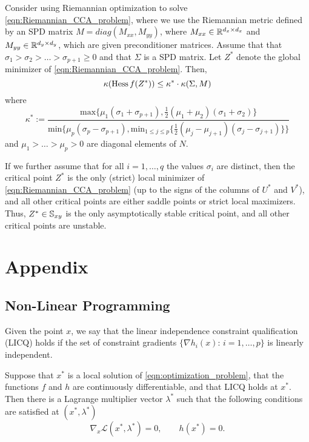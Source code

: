\documentclass[11pt,a4paper]{article}
\begin{document}
\begin{proposition}
Consider using Riemannian optimization to solve \eqref{eqn:Riemannian_CCA_problem}, where we use the Riemannian metric defined by an SPD matrix $M = diag(M_{xx},M_{yy})$, where $M_{xx}\in\mathbb{R}^{d_x\times d_x}$ and $M_{yy}\in\mathbb{R}^{d_y\times d_y}$, which are given preconditioner matrices. Assume that that $\sigma_1>\sigma_2>\ldots>\sigma_{p+1}\ge 0$ and that $\Sigma$ is a SPD matrix. Let $Z^*$ denote the global minimizer of \eqref{eqn:Riemannian_CCA_problem}. Then,
\begin{equation*}
\kappa(\text{Hess}\, f(Z^*)) \le \kappa^*\cdot \kappa(\Sigma, M)
\end{equation*}
where 
\begin{equation*}
\kappa^* := \dfrac{\text{max}\{\mu_1(\sigma_1+\sigma_{p+1}),\frac{1}{2}(\mu_1+\mu_2)(\sigma_1+\sigma_{2})\}}{\text{min}\{\mu_p(\sigma_p-\sigma_{p+1}),{\text{min}}_{1\le j\le p}\{\frac{1}{2}(\mu_j-\mu_{j+1})(\sigma_j-\sigma_{j+1})\}\}}
\end{equation*}
and $\mu_1>\ldots>\mu_p>0$ are diagonal elements of $N$.

If we further assume that for all $i = 1,\ldots, q$ the values $\sigma_i$ are distinct, then the critical point $Z^*$ is the only (strict) local minimizer of \eqref{eqn:Riemannian_CCA_problem} (up to the signs of the columns of $U^*$ and $V^*$), and all other critical points are either saddle points or strict local maximizers. Thus, $Z^*\in \mathbb{S}_{xy}$ is the only asymptotically stable critical point, and all other critical points are unstable.
\end{proposition}


\section{Appendix}

\subsection{Non-Linear Programming}

\begin{definition}
Given the point $x$, we say that the linear independence constraint qualification (LICQ) holds if the set of constraint gradients $\{\nabla h_i(x):\,i = 1,\ldots,p\}$ is linearly independent.
\end{definition}

\begin{proposition}
Suppose that $x^*$ is a local solution of \eqref{eqn:optimization_problem}, that the functions $f$ and $h$ are continuously differentiable, and that LICQ holds at $x^*$. Then there is a Lagrange multiplier vector $\lambda^*$ such that the following conditions are satisfied at $(x^*,\lambda^*)$
\begin{equation}
\nabla_x \mathcal{L}(x^*,\lambda^*) = 0,\qquad h(x^*) = 0. 
\end{equation}
\end{proposition}
\end{document}
